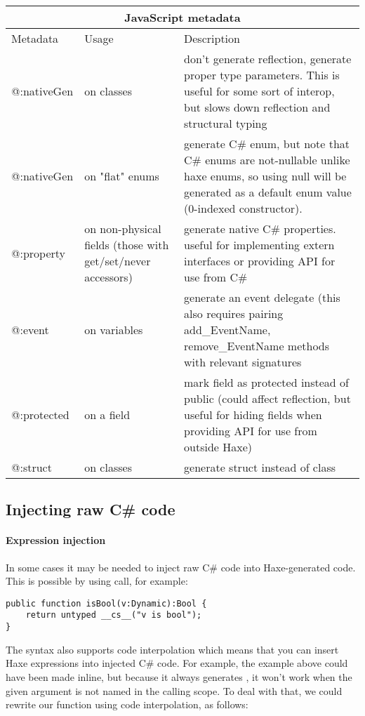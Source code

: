 \begin{center}
\begin{tabular}{| l | l | l |}
	\hline
	\multicolumn{3}{|c|}{JavaScript metadata} \\ \hline
	Metadata & Usage & Description \\ \hline
	@:nativeGen  &  on classes & don't generate reflection, generate proper type parameters. This is useful for some sort of interop, but slows down reflection and structural typing \\
	@:nativeGen  &  on "flat" enums & generate C\# enum, but note that C\# enums are not-nullable unlike haxe enums, so using null will be generated as a default enum value (0-indexed constructor). \\
	@:property  &  on non-physical fields (those with get/set/never accessors) & generate native C\# properties. useful for implementing extern interfaces or providing API for use from C\# \\
	@:event  &  on variables & generate an event delegate (this also requires pairing add_EventName, remove_EventName methods with relevant signatures \\
	@:protected  &  on a field & mark field as protected instead of public (could affect reflection, but useful for hiding fields when providing API for use from outside Haxe) \\
	@:struct  &  on classes  &  generate struct instead of class \\
\end{tabular}
\end{center}

\subsection{Injecting raw C\# code}
\label{target-cs-code-injection}

\paragraph{Expression injection}

In some cases it may be needed to inject raw C\# code into Haxe-generated code. This is possible by using   call, for example:

\begin{lstlisting}
public function isBool(v:Dynamic):Bool {
    return untyped __cs__("v is bool");
}
\end{lstlisting}
The   syntax also supports code interpolation which means that you can insert Haxe expressions into injected C\# code. For example, the example above could have been made inline, but because it always generates  , it won't work when the given argument is not named   in the calling scope. To deal with that, we could rewrite our function using code interpolation, as follows:

